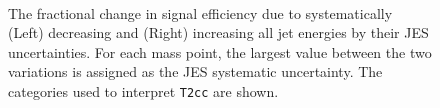 \begin{figure}[h!]
\begin{center}
{    }  
    \\
    \caption{\label{fig:sms-jes-t2cc}The fractional change in
      signal efficiency due to systematically (Left) decreasing and
      (Right) increasing all jet energies by their JES uncertainties. For
      each mass point, the largest value between the two variations is assigned
      as the JES systematic uncertainty. The categories used to interpret \texttt{T2cc} are shown.}
  \end{center}
\end{figure}

